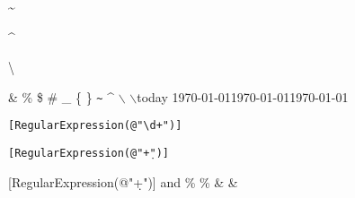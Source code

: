 \documentclass{scrbook}
\begin{document}
\textasciitilde

\textasciicircum

\textbackslash

\& \% \$ \# \_ \{  \} \texttt{\~{}} \^{} $\backslash$ $\backslash$today
\newline
\today \newline \today \newline \today

\verb|[RegularExpression(@"\d+")]|

\texttt{[RegularExpression(@"\string\d+")]}

\textsf{[RegularExpression(@"\string\d+")]} \newline \textlangle and \textrangle \newline \% \% \& \&
\end{document}
